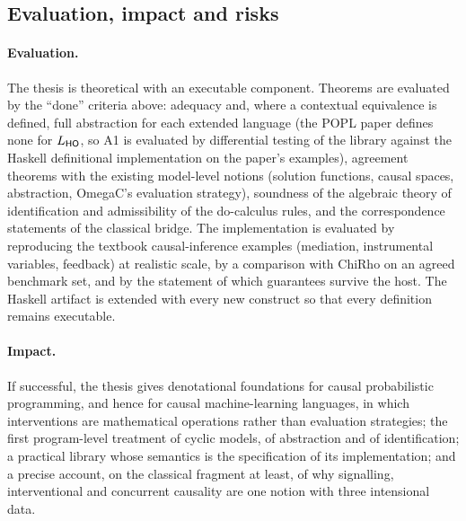 \subsection{Evaluation, impact and risks}\label{sec:prop-risks}

\paragraph{Evaluation.} The thesis is theoretical with an executable component. Theorems are evaluated by the ``done'' criteria above: adequacy and, where a contextual equivalence is defined, full abstraction for each extended language (the POPL paper defines none for $L_{\mathsf{HO}}$, so A1 is evaluated by differential testing of the library against the Haskell definitional implementation on the paper's examples), agreement theorems with the existing model-level notions (solution functions, causal spaces, abstraction, OmegaC's evaluation strategy), soundness of the algebraic theory of identification and admissibility of the do-calculus rules, and the correspondence statements of the classical bridge. The implementation is evaluated by reproducing the textbook causal-inference examples (mediation, instrumental variables, feedback) at realistic scale, by a comparison with ChiRho on an agreed benchmark set, and by the statement of which guarantees survive the host. The Haskell artifact \cite{ARTIFACT_wang_2026_23207221} is extended with every new construct so that every definition remains executable.

\paragraph{Impact.} If successful, the thesis gives denotational foundations for causal probabilistic programming, and hence for causal machine-learning languages, in which interventions are mathematical operations rather than evaluation strategies; the first program-level treatment of cyclic models, of abstraction and of identification; a practical library whose semantics is the specification of its implementation; and a precise account, on the classical fragment at least, of why signalling, interventional and concurrent causality are one notion with three intensional data.

